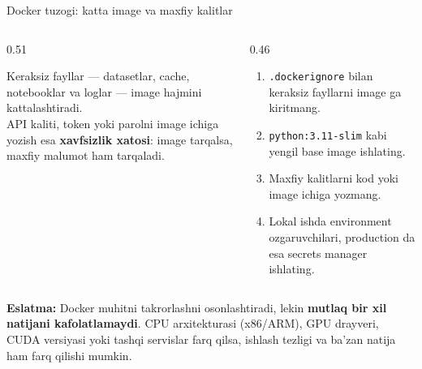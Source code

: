 \documentclass[aspectratio=169,11pt]{beamer}
\newcommand{\uzq}{\textquotesingle{}}   %
\begin{document}
\begin{frame}{Docker tuzog\uzq{}i: katta image va maxfiy kalitlar}
  \small

  \begin{columns}[T,totalwidth=\textwidth]
    \begin{column}{0.51\textwidth}
      \begin{tcolorbox}[warnbox,title={Muammo},top=2pt,bottom=2pt]
        \footnotesize
        Keraksiz fayllar --- datasetlar, cache, notebooklar va loglar ---
        image hajmini kattalashtiradi.\\[3pt]

        API kaliti, token yoki parolni image ichiga yozish esa
        \textbf{xavfsizlik xatosi}: image tarqalsa, maxfiy ma\uzq{}lumot ham
        tarqaladi.
      \end{tcolorbox}
    \end{column}

    \begin{column}{0.46\textwidth}
      \begin{tcolorbox}[okbox,title={Yechim},top=2pt,bottom=2pt]
        \footnotesize
        \begin{enumerate}\setlength\itemsep{2pt}
          \item \texttt{.dockerignore} bilan keraksiz fayllarni image ga kiritmang.
          \item \texttt{python:3.11-slim} kabi yengil base image ishlating.
          \item Maxfiy kalitlarni kod yoki image ichiga yozmang.
          \item Lokal ishda environment o\uzq{}zgaruvchilari, production da esa
                secrets manager ishlating.
        \end{enumerate}
      \end{tcolorbox}
    \end{column}
  \end{columns}

  \vspace{4pt}

  \begin{tcolorbox}[defbox,top=2pt,bottom=2pt,left=4pt,right=4pt]
    \footnotesize
    \textbf{Eslatma:} Docker muhitni takrorlashni osonlashtiradi, lekin
    \textbf{mutlaq bir xil natijani kafolatlamaydi}. CPU arxitekturasi
    (x86/ARM), GPU drayveri, CUDA versiyasi yoki tashqi servislar farq qilsa,
    ishlash tezligi va ba'zan natija ham farq qilishi mumkin.
  \end{tcolorbox}
\end{frame}
\end{document}
